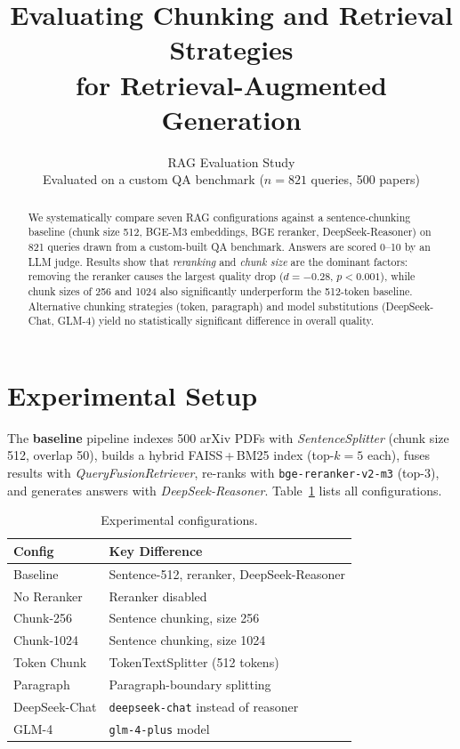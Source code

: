 \documentclass[10pt,twocolumn]{article}
\title{\textbf{Evaluating Chunking and Retrieval Strategies\\
       for Retrieval-Augmented Generation}}
\author{RAG Evaluation Study\\[2pt]
        \small Evaluated on a custom QA benchmark ($n=821$ queries, 500 papers)}
\date{}
\begin{document}
\maketitle

\begin{abstract}
We systematically compare seven RAG configurations against a sentence-chunking
baseline (chunk size 512, BGE-M3 embeddings, BGE reranker, DeepSeek-Reasoner)
on 821 queries drawn from a custom-built QA benchmark.
Answers are scored 0–10 by an LLM judge.
Results show that \emph{reranking} and \emph{chunk size} are the dominant
factors: removing the reranker causes the largest quality drop
($d{=}{-}0.28$, $p{<}0.001$), while chunk sizes of 256 and 1024 also
significantly underperform the 512-token baseline.
Alternative chunking strategies (token, paragraph) and model substitutions
(DeepSeek-Chat, GLM-4) yield no statistically significant difference in
overall quality.
\end{abstract}

\section{Experimental Setup}

The \textbf{baseline} pipeline indexes 500 arXiv PDFs with
\textit{SentenceSplitter} (chunk size 512, overlap 50), builds a hybrid
FAISS\,+\,BM25 index (top-$k{=}5$ each), fuses results with
\textit{QueryFusionRetriever}, re-ranks with
\texttt{bge-reranker-v2-m3} (top-3), and generates answers with
\textit{DeepSeek-Reasoner}.
Table~\ref{tab:configs} lists all configurations.

\begin{table}[h]
\centering\small
\caption{Experimental configurations.}
\label{tab:configs}
\begin{tabular}{@{}lp{4.5cm}@{}}
\toprule
\textbf{Config} & \textbf{Key Difference} \\
\midrule
Baseline       & Sentence-512, reranker, DeepSeek-Reasoner \\
No Reranker    & Reranker disabled \\
Chunk-256      & Sentence chunking, size 256 \\
Chunk-1024     & Sentence chunking, size 1024 \\
Token Chunk    & TokenTextSplitter (512 tokens) \\
Paragraph      & Paragraph-boundary splitting \\
DeepSeek-Chat  & \texttt{deepseek-chat} instead of reasoner \\
GLM-4          & \texttt{glm-4-plus} model \\
\bottomrule
\end{tabular}
\end{table}
\end{document}
